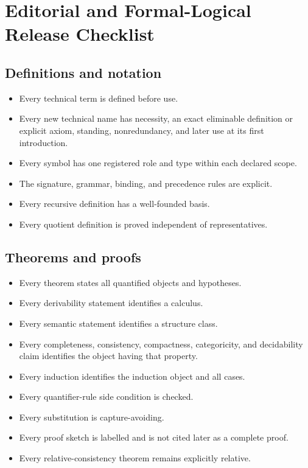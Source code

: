 \chapter{Editorial and Formal-Logical Release Checklist}
\label{ch:release-checklist}
\label{app:release-checklist}

\section{Definitions and notation}
\label{sec:release-checklist-01}
\begin{itemize}
  \item Every technical term is defined before use.
  \item Every new technical name has necessity, an exact eliminable definition
        or explicit axiom, standing, nonredundancy, and later use at its first
        introduction.
  \item Every symbol has one registered role and type within each declared
        scope.
  \item The signature, grammar, binding, and precedence rules are explicit.
  \item Every recursive definition has a well-founded basis.
  \item Every quotient definition is proved independent of representatives.
\end{itemize}

\section{Theorems and proofs}
\label{sec:release-checklist-02}
\begin{itemize}
  \item Every theorem states all quantified objects and hypotheses.
  \item Every derivability statement identifies a calculus.
  \item Every semantic statement identifies a structure class.
  \item Every completeness, consistency, compactness, categoricity, and
        decidability claim identifies the object having that property.
  \item Every induction identifies the induction object and all cases.
  \item Every quantifier-rule side condition is checked.
  \item Every substitution is capture-avoiding.
  \item Every proof sketch is labelled and is not cited later as a complete
        proof.
  \item Every relative-consistency theorem remains explicitly relative.
\end{itemize}

